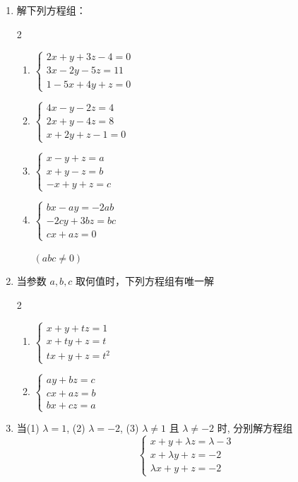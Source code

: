 \begin{enumerate}
\item 解下列方程组：
\begin{multicols}{2}
    \begin{enumerate}
    \item $\begin{cases}2 x+y+3 z-4=0 \\ 3 x-2 y-5 z=11 \\ 1-5 x+4 y+z=0\end{cases}$
    \item $\begin{cases}4 x-y-2 z=4 \\ 2 x+y-4z=8 \\ x+2 y+z-1=0\end{cases}$
    \item $\begin{cases} x-y+z =a \\ x+y-z =b \\-x+y+z =c \end{cases}$
    \item $\begin{cases}b x-a y=-2 a b \\ -2 c y+3 b z=b c \\ c x+a z=0\end{cases} $
   
    $(a b c \neq 0)$
\end{enumerate}
\end{multicols}


\item 
当参数 $a,b,c$ 取何值时，下列方程组有唯一解
\begin{multicols}{2}
\begin{enumerate}
    \item $\begin{cases}x+y+t z=1  \\ x+ty+z  =t \\ tx+y+z  =t^{2}\end{cases}$
    \item $\begin{cases}a y+b z=c \\ c x+a z=b \\ b x+c z=a\end{cases}$
\end{enumerate}
\end{multicols}

\item 当(1) $\lambda=1$, (2) $\lambda=-2$, (3) $\lambda \neq 1$ 且 $\lambda\ne -2$ 时, 分别解方程组
$$
\begin{cases}
x+y+\lambda z=\lambda-3 \\
x+\lambda y+z=-2 \\
\lambda x+y+z=-2
\end{cases}
$$


\end{enumerate}

